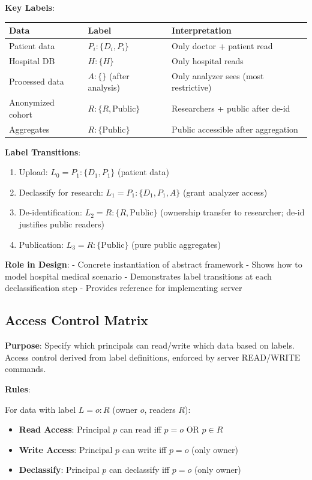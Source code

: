 \textbf{Key Labels}:

\begin{tabular}{|l|l|l|}
\hline
\textbf{Data} & \textbf{Label} & \textbf{Interpretation} \\
\hline
Patient data & $P_i: \{D_i, P_i\}$ & Only doctor + patient read \\
\hline
Hospital DB & $H: \{H\}$ & Only hospital reads \\
\hline
Processed data & $A: \{\}$ (after analysis) & Only analyzer sees (most restrictive) \\
\hline
Anonymized cohort & $R: \{R, \text{Public}\}$ & Researchers + public after de-id \\
\hline
Aggregates & $R: \{\text{Public}\}$ & Public accessible after aggregation \\
\hline
\end{tabular}

\textbf{Label Transitions}:

\begin{enumerate}
\item Upload: $L_0 = P_1: \{D_1, P_1\}$ (patient data)
\item Declassify for research: $L_1 = P_1: \{D_1, P_1, A\}$ (grant analyzer access)
\item De-identification: $L_2 = R: \{R, \text{Public}\}$ (ownership transfer to researcher; de-id justifies public readers)
\item Publication: $L_3 = R: \{\text{Public}\}$ (pure public aggregates)
\end{enumerate}

\textbf{Role in Design}:
- Concrete instantiation of abstract framework
- Shows how to model hospital medical scenario
- Demonstrates label transitions at each declassification step
- Provides reference for implementing server

\subsection{Access Control Matrix}

\textbf{Purpose}: Specify which principals can read/write which data based on labels. Access control derived from label definitions, enforced by server READ/WRITE commands.

\textbf{Rules}:

For data with label $L = o: R$ (owner $o$, readers $R$):
\begin{itemize}
\item \textbf{Read Access}: Principal $p$ can read iff $p = o$ OR $p \in R$
\item \textbf{Write Access}: Principal $p$ can write iff $p = o$ (only owner)
\item \textbf{Declassify}: Principal $p$ can declassify iff $p = o$ (only owner)
\end{itemize}

